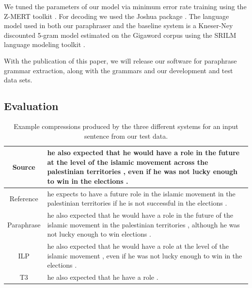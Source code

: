 \documentclass[11pt]{article}
\begin{document}
We tuned the parameters of our model via minimum error rate training
using the Z-MERT toolkit \cite{Zaidan2009}. For decoding we used the
Joshua package \cite{Joshua-WMT}. The language model used in both our
paraphraser and the  baseline system is a
Kneser-Ney discounted 5-gram model estimated on the Gigaword corpus
using the SRILM language modeling toolkit \cite{SRILM}.

With the publication of this paper, we will release our software for
paraphrase grammar extraction, along with the grammars and our
development and test data sets.


\subsection{Evaluation} \label{evaluation}

\begin{table}
\begin{center}
\small
\begin{tabular}{|c|p{13.2cm}|}
  \hline
  Source & he also expected that he would have a role in the future at
  the level of the islamic movement across the palestinian territories
  , even if he was not lucky enough to win in the elections . \\
  \hline
  Reference & he expects to have a future role in the islamic movement
  in the palestinian territories if he is not successful in the
  elections . \\
  \hline
  Paraphrase & he also expected that he would have a role in the future
  of the islamic movement in the palestinian territories , although he
  was not lucky enough to win elections . \\
  \hline
  ILP & he also expected that he would have a role at the level of the
  islamic movement , even if he was not lucky enough to win in the
  elections . \\
  \hline
  T3 & he also expected that he have a role . \\
  \hline
\end{tabular}
\normalsize
\end{center}
\caption{Example compressions produced by the three different systems
  for an input sentence from our test data.}
\label{test_examples}
\end{table}
\end{document}
